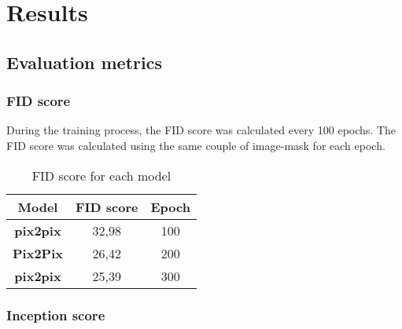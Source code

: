 \section{Results}
\label{sec:results}
\subsection{Evaluation metrics}
\subsubsection{FID score}
During the training process, the FID score was calculated every 100 epochs. 
The FID score was calculated using the same couple of image-mask for each epoch.
\begin{table}[H]
    \centering
    \begin{tabular}{|c|c|c|}
        \hline
        \textbf{Model} & \textbf{FID score} & \textbf{Epoch} \\
        \hline
        \hline
        \textbf{pix2pix} & 32,98 & 100 \\
        \hline
        \textbf{Pix2Pix} & 26,42 & 200 \\
        \hline
        \textbf{pix2pix} & 25,39 & 300 \\
    \end{tabular}
    \caption{FID score for each model}
    \label{tab:fid-score}
\end{table}
\subsubsection{Inception score}

